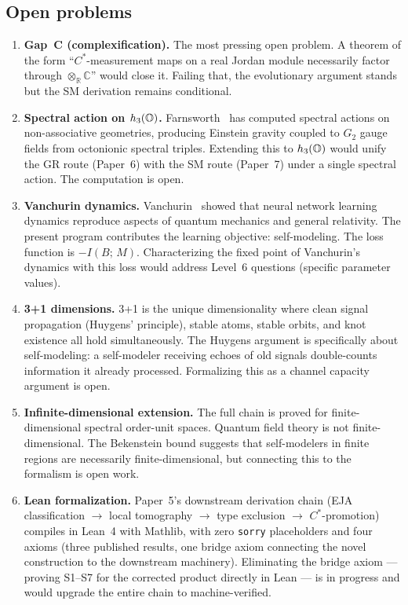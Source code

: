 \subsection{Open problems}
\label{subsec:open-problems}

\begin{enumerate}
\item \textbf{Gap~C (complexification).}  The most pressing open
  problem.  A theorem of the form ``$C^*$-measurement maps on a real
  Jordan module necessarily factor through $\otimes_{\mathbb{R}}
  \mathbb{C}$'' would close it.  Failing that, the evolutionary
  argument stands but the SM derivation remains conditional.

\item \textbf{Spectral action on $h_3(\mathbb{O})$.}
  Farnsworth~\citep{farnsworth2015} has computed spectral actions on
  non-associative geometries, producing Einstein gravity coupled to
  $G_2$ gauge fields from octonionic spectral triples.  Extending this
  to $h_3(\mathbb{O})$ would unify the GR route (Paper~6) with the SM route
  (Paper~7) under a single spectral action.  The computation is open.

\item \textbf{Vanchurin dynamics.}  Vanchurin~\citep{vanchurin2020,
  vanchurin2024} showed that neural network learning dynamics reproduce
  aspects of quantum mechanics and general relativity.  The present
  program contributes the learning objective: self-modeling.  The loss
  function is $-I(B;\,M)$.  Characterizing the fixed point of
  Vanchurin's dynamics with this loss would address Level~6 questions
  (specific parameter values).

\item \textbf{3+1 dimensions.}  3+1 is the unique dimensionality
  where clean signal propagation (Huygens' principle), stable atoms,
  stable orbits, and knot existence all hold simultaneously.  The
  Huygens argument is specifically about self-modeling: a self-modeler
  receiving echoes of old signals double-counts information it already
  processed.  Formalizing this as a channel capacity argument is open.

\item \textbf{Infinite-dimensional extension.}  The full chain is
  proved for finite-dimensional spectral order-unit spaces.  Quantum
  field theory is not finite-dimensional.  The Bekenstein bound
  suggests that self-modelers in finite regions are necessarily
  finite-dimensional, but connecting this to the formalism is open
  work.

\item \textbf{Lean formalization.}  Paper~5's downstream derivation
  chain (EJA classification $\to$ local tomography $\to$ type
  exclusion $\to$ $C^*$-promotion) compiles in Lean~4 with Mathlib,
  with zero \texttt{sorry} placeholders and four axioms (three
  published results, one bridge axiom connecting the novel construction
  to the downstream machinery).  Eliminating the bridge axiom ---
  proving S1--S7 for the corrected product directly in Lean --- is in
  progress and would upgrade the entire chain to machine-verified.
\end{enumerate}

